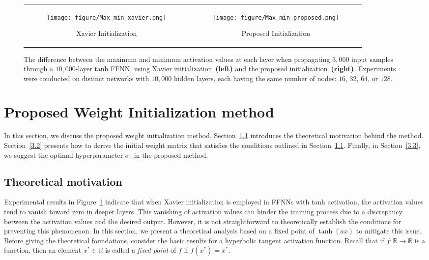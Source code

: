 \documentclass{article} \usepackage{iclr2025_conference,times}
\begin{document}
\begin{figure}[t!]
\centering 
\begin{tabular}{cc}
\begin{subfigure}[b]{0.45\textwidth}
    \centering
    \texttt{[image: figure/Max\_min\_xavier.png]}
    \caption{Xavier Initialization}
\end{subfigure} &
\begin{subfigure}[b]{0.45\textwidth}
    \centering
    \texttt{[image: figure/Max\_min\_proposed.png]}
    \caption{Proposed Initialization}
\end{subfigure} 
\end{tabular}
\caption{The difference between the maximum and minimum activation values at each layer when propagating $3,000$ input samples through a $10,000$-layer tanh FFNN, using Xavier initialization~\textbf{(left)} and the proposed initialization~\textbf{(right)}. Experiments were conducted on distinct networks with $10,000$ hidden layers, each having the same number of nodes: $16$, $32$, $64$, or $128$.} 
\label{fig:minmax}
\end{figure}


\section{Proposed Weight Initialization method}
\label{sec:gen_inst}
In this section, we discuss the proposed weight initialization method. Section~\ref{3.1} introduces the theoretical motivation behind the method. Section~\ref{3.2} presents how to derive the initial weight matrix that satisfies the conditions outlined in Section~\ref{3.1}. Finally, in Section~\ref{3.3}, we suggest the optimal hyperparameter $\sigma_z$ in the proposed method. 

\subsection{Theoretical motivation}\label{3.1}
Experimental results in Figure~\ref{fig:minmax} indicate that when Xavier initialization is employed in FFNNs with tanh activation, 
the activation values tend to vanish toward zero in deeper layers. This vanishing of activation values can hinder the training process due to a discrepancy between the activation values and the desired output. 
However, it is not straightforward to theoretically establish the conditions for preventing this phenomenon.
In this section, we present a theoretical analysis based on a fixed point of $\tanh(ax)$ to mitigate this issue. Before giving the theoretical foundations, consider the basic results for a hyperbolic tangent activation function. 
Recall that if \(f: \mathbb{R} \to \mathbb{R}\) is a function, then an element \(x^* \in \mathbb{R}\) is called a \emph{fixed point} of \(f\) if \(f(x^*) = x^*\).
\end{document}
